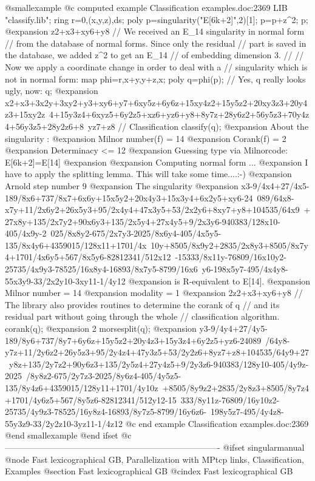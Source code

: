 @smallexample
@c computed example Classification examples.doc:2369 
  LIB "classify.lib";
  ring r=0,(x,y,z),ds;
  poly p=singularity("E[6k+2]",2)[1];
  p=p+z^2;
  p;
@expansion{} z2+x3+xy6+y8
  // We received an E_14 singularity in normal form
  // from the database of normal forms. Since only the residual
  // part is saved in the database, we added z^2 to get an E_14
  // of embedding dimension 3.
  //
  // Now we apply a coordinate change in order to deal with a
  // singularity which is not in normal form:
  map phi=r,x+y,y+z,x;
  poly q=phi(p);
  // Yes, q really looks ugly, now:
  q;
@expansion{} x2+x3+3x2y+3xy2+y3+xy6+y7+6xy5z+6y6z+15xy4z2+15y5z2+20xy3z3+20y4z3+15xy2z\
   4+15y3z4+6xyz5+6y2z5+xz6+yz6+y8+8y7z+28y6z2+56y5z3+70y4z4+56y3z5+28y2z6+8\
   yz7+z8
  // Classification
  classify(q);
@expansion{} About the singularity :
@expansion{}           Milnor number(f)   = 14
@expansion{}           Corank(f)          = 2
@expansion{}           Determinacy       <= 12
@expansion{} Guessing type via Milnorcode:   E[6k+2]=E[14]
@expansion{} 
@expansion{} Computing normal form ...
@expansion{} I have to apply the splitting lemma. This will take some time....:-)
@expansion{}    Arnold step number 9
@expansion{} The singularity
@expansion{}    x3-9/4x4+27/4x5-189/8x6+737/8x7+6x6y+15x5y2+20x4y3+15x3y4+6x2y5+xy6-24\
   089/64x8-x7y+11/2x6y2+26x5y3+95/2x4y4+47x3y5+53/2x2y6+8xy7+y8+104535/64x9\
   +27x8y+135/2x7y2+90x6y3+135/2x5y4+27x4y5+9/2x3y6-940383/128x10-405/4x9y-2\
   025/8x8y2-675/2x7y3-2025/8x6y4-405/4x5y5-135/8x4y6+4359015/128x11+1701/4x\
   10y+8505/8x9y2+2835/2x8y3+8505/8x7y4+1701/4x6y5+567/8x5y6-82812341/512x12\
   -15333/8x11y-76809/16x10y2-25735/4x9y3-78525/16x8y4-16893/8x7y5-8799/16x6\
   y6-198x5y7-495/4x4y8-55x3y9-33/2x2y10-3xy11-1/4y12
@expansion{} is R-equivalent to E[14].
@expansion{}    Milnor number = 14
@expansion{}    modality      = 1
@expansion{} 2z2+x3+xy6+y8
  // The library also provides routines to determine the corank of q
  // and its residual part without going through the whole
  // classification algorithm.
  corank(q);
@expansion{} 2
  morsesplit(q);
@expansion{} y3-9/4y4+27/4y5-189/8y6+737/8y7+6y6z+15y5z2+20y4z3+15y3z4+6y2z5+yz6-24089\
   /64y8-y7z+11/2y6z2+26y5z3+95/2y4z4+47y3z5+53/2y2z6+8yz7+z8+104535/64y9+27\
   y8z+135/2y7z2+90y6z3+135/2y5z4+27y4z5+9/2y3z6-940383/128y10-405/4y9z-2025\
   /8y8z2-675/2y7z3-2025/8y6z4-405/4y5z5-135/8y4z6+4359015/128y11+1701/4y10z\
   +8505/8y9z2+2835/2y8z3+8505/8y7z4+1701/4y6z5+567/8y5z6-82812341/512y12-15\
   333/8y11z-76809/16y10z2-25735/4y9z3-78525/16y8z4-16893/8y7z5-8799/16y6z6-\
   198y5z7-495/4y4z8-55y3z9-33/2y2z10-3yz11-1/4z12
@c end example Classification examples.doc:2369
@end smallexample
@end ifset
@c ----------------------------------------------------------------------------
@ifset singularmanual
@node Fast lexicographical GB, Parallelization with MPtcp links, Classification, Examples
@section Fast lexicographical GB
@cindex Fast lexicographical GB

